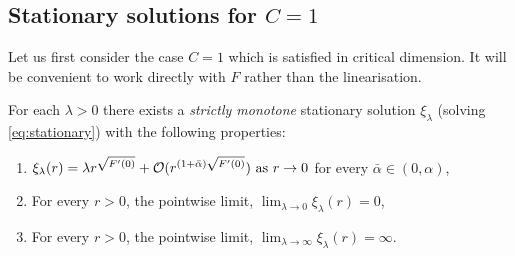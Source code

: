 \documentclass{amsart}
\begin{document}
\subsection{Stationary solutions for \(C=1\)}

Let us first consider the case \(C = 1\) which is satisfied in critical dimension. It will be convenient to work directly with \(F\) rather than the linearisation.

\begin{lemma}
\label{lem:stationaryC1}
For each \(\lambda > 0 \) there exists a \emph{strictly monotone} stationary solution \(\xi_{\lambda}\) (solving \eqref{eq:stationary}) with the following properties:
\begin{enumerate}
\item \(\xi_{\lambda} (r) = \lambda r^{\sqrt{F'(0)}} + \operatorname{\mathcal{O}}(r^{(1+\bar{\alpha}) \sqrt{F'(0)}}) \text{ as } r \to 0\) for every \(\bar{\alpha} \in (0, \alpha)\), \label{itm:stationaryC1_asymptotic}
\item For every \(r > 0\), the pointwise limit, \(\lim_{\lambda \to 0} \xi_{\lambda} (r) = 0\), \label{itm:stationaryC1_lambda_0}
\item For every \(r > 0\), the pointwise limit, \(\lim_{\lambda \to \infty} \xi_{\lambda} (r) = \infty\). \label{itm:stationaryC1_lambda_infty}
\end{enumerate}
\end{lemma}
\end{document}
